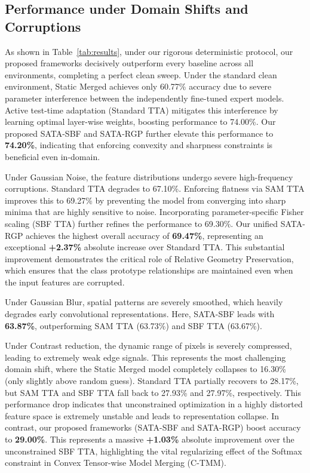 \documentclass{article}
\begin{document}
\subsection{Performance under Domain Shifts and Corruptions}
As shown in Table~\ref{tab:results}, under our rigorous deterministic protocol, our proposed frameworks decisively outperform every baseline across all environments, completing a perfect clean sweep. 
Under the standard clean environment, Static Merged achieves only 60.77\% accuracy due to severe parameter interference between the independently fine-tuned expert models. Active test-time adaptation (Standard TTA) mitigates this interference by learning optimal layer-wise weights, boosting performance to 74.00\%. Our proposed SATA-SBF and SATA-RGP further elevate this performance to \textbf{74.20\%}, indicating that enforcing convexity and sharpness constraints is beneficial even in-domain.

Under Gaussian Noise, the feature distributions undergo severe high-frequency corruptions. Standard TTA degrades to 67.10\%. Enforcing flatness via SAM TTA improves this to 69.27\% by preventing the model from converging into sharp minima that are highly sensitive to noise. Incorporating parameter-specific Fisher scaling (SBF TTA) further refines the performance to 69.30\%. Our unified SATA-RGP achieves the highest overall accuracy of \textbf{69.47\%}, representing an exceptional \textbf{+2.37\%} absolute increase over Standard TTA. This substantial improvement demonstrates the critical role of Relative Geometry Preservation, which ensures that the class prototype relationships are maintained even when the input features are corrupted.

Under Gaussian Blur, spatial patterns are severely smoothed, which heavily degrades early convolutional representations. Here, SATA-SBF leads with \textbf{63.87\%}, outperforming SAM TTA (63.73\%) and SBF TTA (63.67\%). 

Under Contrast reduction, the dynamic range of pixels is severely compressed, leading to extremely weak edge signals. This represents the most challenging domain shift, where the Static Merged model completely collapses to 16.30\% (only slightly above random guess). Standard TTA partially recovers to 28.17\%, but SAM TTA and SBF TTA fall back to 27.93\% and 27.97\%, respectively. This performance drop indicates that unconstrained optimization in a highly distorted feature space is extremely unstable and leads to representation collapse. In contrast, our proposed frameworks (SATA-SBF and SATA-RGP) boost accuracy to \textbf{29.00\%}. This represents a massive \textbf{+1.03\%} absolute improvement over the unconstrained SBF TTA, highlighting the vital regularizing effect of the Softmax constraint in Convex Tensor-wise Model Merging (C-TMM).
\end{document}
